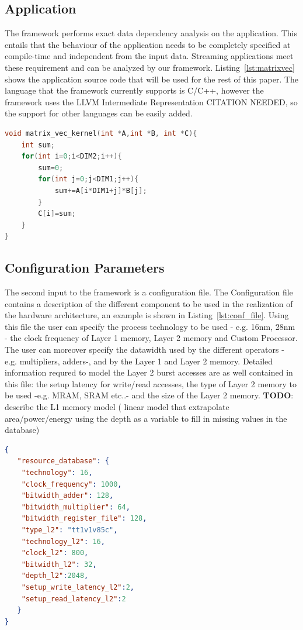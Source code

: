 \subsection{Application}
\label{ssec:app}
The framework performs exact data dependency analysis on the application. This entails that the behaviour of the application needs to be completely specified at compile-time and independent from the input data. Streaming applications meet these requirement and can be analyzed by our framework. Listing~\ref{lst:matrixvec} shows the application source code that will be used for the rest of this paper. The language that the framework currently supports is C/C++, however the framework uses the LLVM Intermediate Representation CITATION NEEDED, so the support for other languages can be easily added.
\begin{lstlisting}[language=C, caption={Example of input application, C implementation of a matrix vector multiplication.}, label={lst:matrixvec}]
void matrix_vec_kernel(int *A,int *B, int *C){
    int sum;
    for(int i=0;i<DIM2;i++){
        sum=0;
        for(int j=0;j<DIM1;j++){
            sum+=A[i*DIM1+j]*B[j];
        }
        C[i]=sum;
    }
}
\end{lstlisting}

\subsection{Configuration Parameters}
\label{ssec:conf_param}
The second input to the framework is a configuration file. The Configuration file contains a description of the different component to be used in the realization of the hardware architecture, an example is shown in Listing~\ref{lst:conf_file}. Using this file the user can specify the process technology to be used - e.g. 16nm, 28nm - the clock frequency of Layer 1 memory, Layer 2 memory and Custom Processor. The user can moreover specify the datawidth used by the different operators - e.g. multipliers, adders-, and by the Layer 1 and Layer 2 memory. 
Detailed information requred to model the Layer 2 burst accesses are as well contained in this file: the setup latency for write/read accesses, the type of Layer 2 memory to be used -e.g. MRAM, SRAM etc..- and the size of the Layer 2 memory.
\textbf{TODO}: describe the L1 memory model ( linear model that extrapolate area/power/energy using the depth as a variable to fill in missing values in the database)
\begin{lstlisting}[language=json, caption={Example of input configuration file}, label={lst:conf_file}]
{ 
   "resource_database": { 
	"technology": 16, 
	"clock_frequency": 1000, 
	"bitwidth_adder": 128, 
	"bitwidth_multiplier": 64, 
	"bitwidth_register_file": 128, 
	"type_l2": "tt1v1v85c", 
	"technology_l2": 16, 
	"clock_l2": 800, 
	"bitwidth_l2": 32, 
	"depth_l2":2048, 
	"setup_write_latency_l2":2, 
	"setup_read_latency_l2":2 
   } 
}

\end{lstlisting}

